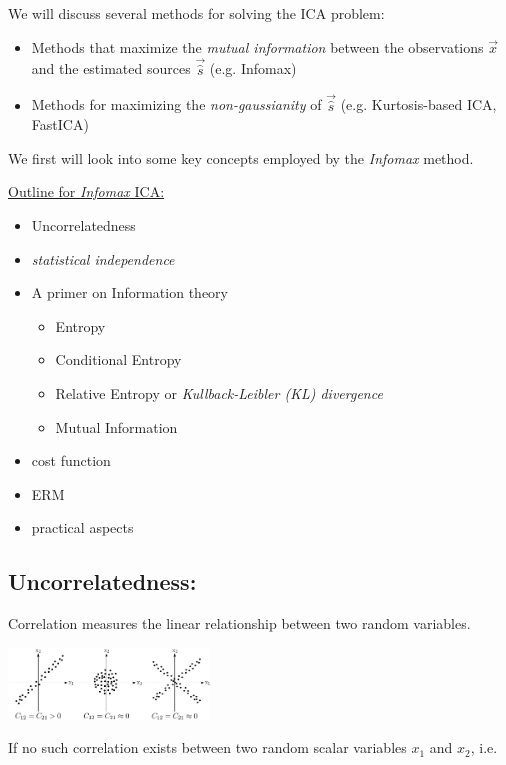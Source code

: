 We will discuss several methods for solving the ICA problem:

\begin{itemize}
\item Methods that maximize the \emph{mutual information} between the observations $\vec x$ and the estimated sources $\vec {\hat s}$ (e.g. Infomax)
\item Methods for maximizing the \emph{non-gaussianity} of $\vec {\hat s}$ (e.g. Kurtosis-based ICA, FastICA)
\end{itemize}

We first will look into some key concepts employed by the \emph{Infomax} method.

\clearpage

\underline{Outline for \emph{Infomax} ICA:}
\begin{itemize}
    \item Uncorrelatedness
    \item \emph{statistical independence}
    \item A primer on Information theory
    \begin{itemize}
        \item Entropy
        \item Conditional Entropy
        \item Relative Entropy or \emph{Kullback-Leibler (KL) divergence}
        \item Mutual Information
    \end{itemize}
    \item cost function
    \item ERM
    \item practical aspects
\end{itemize}

\subsection{Uncorrelatedness:}

Correlation measures the linear relationship between two random variables.
\begin{center}
\includegraphics[width=0.4\textwidth]{img/section2_fig3.pdf}
\end{center}

If no such correlation exists between two random scalar variables $x_1$ and $x_2$, i.e.

